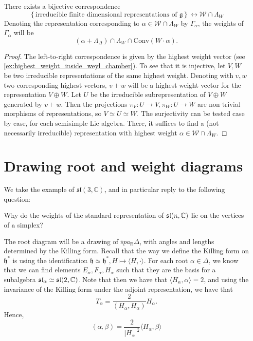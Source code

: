 \documentclass{report}
\begin{document}
\begin{theorem}
    There exists a bijective correspondence
    \[
    \left\{ \text{irreducible finite dimensional representations of } \mathfrak g \right\} \leftrightarrow \mathcal W \cap \Lambda_W
    \]
    Denoting the representation corresponding to $\alpha \in \mathcal W \cap \Lambda_W$ by $\Gamma_\alpha$, the weights of $\Gamma_\alpha$ will be $$(\alpha + \Lambda_\Delta) \cap \Lambda_W \cap \mathrm{Conv}(W \cdot \alpha).$$
\end{theorem}
\begin{proof}
    The left-to-right correspondence is given by the highest weight vector (see \cref{ex:highest_weight_inside_weyl_chamber}).
    To see that it is injective, let $V, W$ be two irreducible representations of the same highest weight.
    Denoting with $v, w$ two corresponding highest vectors, $v+w$ will be a highest weight vector for the representation $V \oplus W$.
    Let $U$ be the irreducible subrepresentation of $V \oplus W$ generated by $v+w$.
    Then the projections $\pi_V: U \to V, \pi_W: U \to W$ are non-trivial morphisms of representations, so $V \simeq U \simeq W$.
    The surjectivity can be tested case by case, for each semisimple Lie algebra.
    There, it suffices to find a (not necessarily irreducible) representation with highest weight $\alpha \in \mathcal W \cap \Lambda_W$.
\end{proof}

\section{Drawing root and weight diagrams}
We take the example of $\mathfrak{sl}(3, \mathbb C)$, and in particular reply to the following question:
\begin{question}
    Why do the weights of the standard representation of $\operatorname{{\mathfrak{sl}}}(n, \mathbb C)$ lie on the vertices of a simplex?
\end{question}

The root diagram will be a drawing of $\mathbb spa_{\mathbb R} \Delta$, with angles and lengths determined by the Killing form.
Recall that the way we define the Killing form on $\mathfrak h^*$ is using the identification $\mathfrak h \simeq \mathfrak h^*, H \mapsto \langle H, \cdot \rangle$.
For each root $\alpha \in \Delta$, we know that we can find elements $E_\alpha, F_\alpha, H_\alpha$ such that they are the basis for a subalgebra $\operatorname{{\mathfrak{sl}}}_\alpha \simeq \operatorname{{\mathfrak{sl}}}(2, \mathbb C)$.
Note that then we have that $\langle H_\alpha, \alpha \rangle = 2$, and using the invariance of the Killing form under the adjoint representation, we have that
\[
T_\alpha = \frac{2}{(H_\alpha, H_\alpha)} H_\alpha.
\]
Hence,
\[
(\alpha, \beta) = \frac{2}{|H_\alpha|^2} \langle H_\alpha, \beta \rangle
\]
\end{document}
